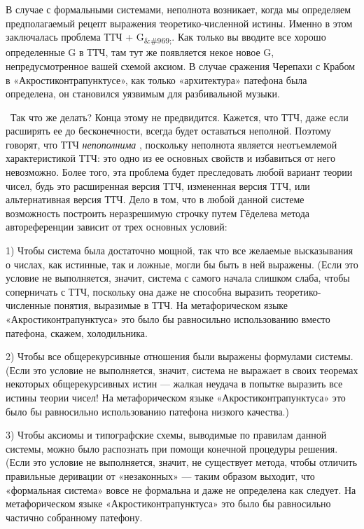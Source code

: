 \documentclass[../main.tex]{subfiles}
\begin{document}
В случае с формальными системами, неполнота возникает, когда мы определяем предполагаемый рецепт выражения теоретико-численной истины. Именно в этом заключалась проблема ТТЧ + G\textsubscript{\&\#969;}. Как только вы вводите все хорошо определенные G в ТТЧ, там тут же появляется некое новое G, непредусмотренное вашей схемой аксиом. В случае сражения Черепахи с Крабом в «Акростиконтрапунктусе», как только «архитектура» патефона была определена, он становился уязвимым для разбивальной музыки.

~Так что же делать? Конца этому не предвидится. Кажется, что ТТЧ, даже если расширять ее до бесконечности, всегда будет оставаться неполной. Поэтому говорят, что ТТЧ \emph{непополнима} , поскольку неполнота является неотъемлемой характеристикой ТТЧ: это одно из ее основных свойств и избавиться от него невозможно. Более того, эта проблема будет преследовать любой вариант теории чисел, будь это расширенная версия ТТЧ, измененная версия ТТЧ, или альтернативная версия ТТЧ. Дело в том, что в любой данной системе возможность построить неразрешимую строчку путем Гёделева метода автореференции зависит от трех основных условий:

1) Чтобы система была достаточно мощной, так что все желаемые высказывания о числах, как истинные, так и ложные, могли бы быть в ней выражены. (Если это условие не выполняется, значит, система с самого начала слишком слаба, чтобы соперничать с ТТЧ, поскольку она даже не способна выразить теоретико-численные понятия, выразимые в ТТЧ. На метафорическом языке «Акростиконтрапунктуса» это было бы равносильно использованию вместо патефона, скажем, холодильника.

2) Чтобы все общерекурсивные отношения были выражены формулами системы. (Если это условие не выполняется, значит, система не выражает в своих теоремах некоторых общерекурсивных истин --- жалкая неудача в попытке выразить все истины теории чисел! На метафорическом языке «Акростиконтрапунктуса» это было бы равносильно использованию патефона низкого качества.)

3) Чтобы аксиомы и типографские схемы, выводимые по правилам данной системы, можно было распознать при помощи конечной процедуры решения. (Если это условие не выполняется, значит, не существует метода, чтобы отличить правильные деривации от «незаконных» --- таким образом выходит, что «формальная система» вовсе не формальна и даже не определена как следует. На метафорическом языке «Акростиконтрапунктуса» это было бы равносильно частично собранному патефону.
\end{document}
